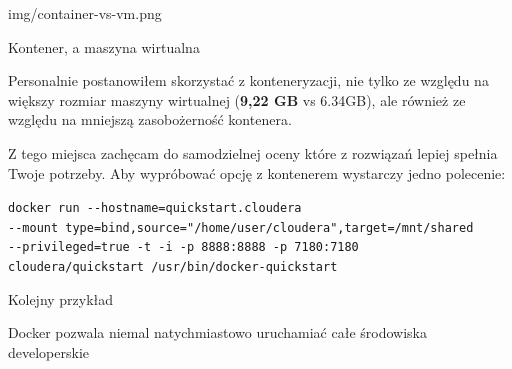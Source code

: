 \documentclass[aspectratio=169]{beamer}
\begin{document}
\begin{frameImg}[1080]{img/container-vs-vm.png}
    \vspace*{-40mm}
    \begin{cardTiny}
        Kontener, a maszyna wirtualna
    \end{cardTiny}
\end{frameImg}

\begin{frame}
    \begin{cardTiny}
        Personalnie postanowiłem skorzystać z konteneryzacji, nie tylko ze względu na większy rozmiar maszyny wirtualnej (\textbf{9,22 GB} vs 6.34GB),
        ale również ze względu na mniejszą zasobożerność kontenera.
    \end{cardTiny}
    \begin{cardTiny}
        Z tego miejsca zachęcam do samodzielnej oceny które z rozwiązań lepiej spełnia Twoje potrzeby.
        Aby wypróbować opcję z kontenerem wystarczy jedno polecenie:
    \end{cardTiny}
    \begin{cardTiny}
        \colorbox{dark-gray}{\lstinline{docker run --hostname=quickstart.cloudera}}\\
        \colorbox{dark-gray}{\lstinline{--mount type=bind,source="/home/user/cloudera",target=/mnt/shared}}\\
        \colorbox{dark-gray}{\lstinline{--privileged=true -t -i -p 8888:8888 -p 7180:7180}}\\
        \colorbox{dark-gray}{\lstinline{cloudera/quickstart /usr/bin/docker-quickstart}}
    \end{cardTiny}
\end{frame}

\begin{frame}{Kolejny przykład}
    \begin{cardTiny}
        Docker pozwala niemal natychmiastowo uruchamiać całe środowiska developerskie
    \end{cardTiny}

    \begin{cardTiny}
    \end{cardTiny}
    
\end{frame}
\end{document}
